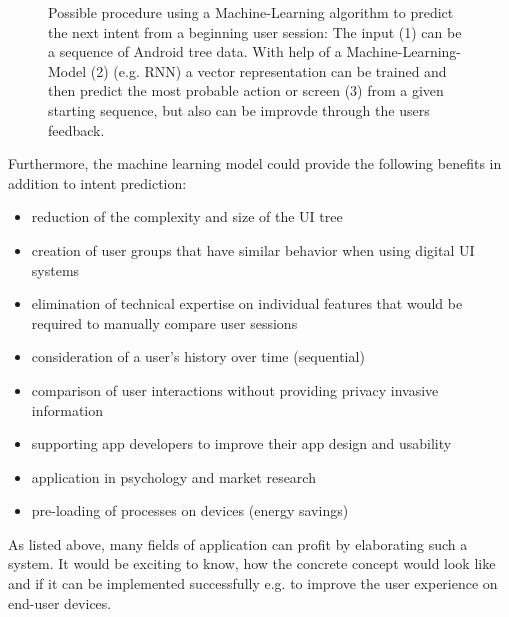 \begin{figure}[htbp!]
  \centering
  
  \caption{Possible procedure using a Machine-Learning algorithm to predict the next intent from a beginning user session: The input (1) can be a sequence of Android tree data. With help of a Machine-Learning-Model (2) (e.g. RNN) a vector representation can be trained and then predict the most probable action or screen (3) from a given starting sequence, but also can be improvde through the users feedback.}
  \label{fig:encode-decode}
\end{figure}

Furthermore, the machine learning model could provide the following benefits in addition to intent prediction:
\begin{itemize}
  \item reduction of the complexity and size of the UI tree
  \item creation of user groups that have similar behavior when using digital UI systems \cite{jayarajah2015need}
  \item elimination of technical expertise on individual features that would be required to manually compare user sessions \cite{ghods2019activity2vec}
  \item consideration of a user's history over time (sequential)
  \item comparison of user interactions without providing privacy invasive information
  \item supporting app developers to improve their app design and usability
  \item application in psychology and market research
  \item pre-loading of processes on devices (energy savings) \cite{shen2019deepapp}
\end{itemize}

As listed above, many fields of application can profit by elaborating such a system. It would be exciting to know, how the concrete concept would look like and if it can be implemented successfully e.g. to improve the user experience on end-user devices.
